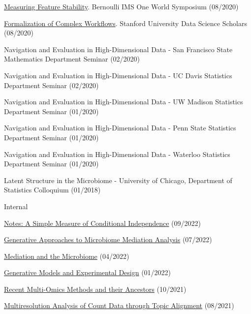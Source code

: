 \documentclass[letterpaper]{article}
\renewenvironment{itemize}{
  \begin{list}{}{
    \setlength{\leftmargin}{1.5em}
  }
}{
  \end{list}
}
\begin{document}
\begin{itemize}
  \item \href{https://www.youtube.com/watch?v=0W84gxCm83A}{Measuring Feature Stability}. Bernoulli IMS One World Symposium (08/2020)
  \item \href{https://drive.google.com/file/d/1mSRbA96aTuiIHSUmgfZKV788seF3X7p_/view?usp=sharing}{Formalization of Complex Workflows}. Stanford University Data Science Scholars (08/2020)
  \item Navigation and Evaluation in High-Dimensional Data - San Francisco State Mathematics Department Seminar (02/2020)
  \item Navigation and Evaluation in High-Dimensional Data - UC Davis Statistics Department Seminar (02/2020)
  \item Navigation and Evaluation in High-Dimensional Data - UW Madison Statistics Department Seminar (01/2020)
  \item Navigation and Evaluation in High-Dimensional Data - Penn State Statistics Department Seminar (01/2020)
  \item Navigation and Evaluation in High-Dimensional Data - Waterloo Statistics Department Seminar (01/2020)
  \item Latent Structure in the Microbiome - University of Chicago, Department of Statistics Colloquium (01/2018)
\end{itemize}

Internal
\begin{itemize}
  \item \href{https://krisrs1128.github.io/talks/2022/20220930/20220930.html}{Notes: A Simple Measure of Conditional Independence} (09/2022)
  \item \href{https://drive.google.com/file/d/1n6gEubzFuIRRRYxGewY81k1ZdQS24oKg/view}{Generative Approaches to Microbiome Mediation Analysis} (07/2022)
  \item \href{https://drive.google.com/file/d/17xNjMA-pH70wM_gknUnM0A5gr0k87gAo/view}{Mediation and the Microbiome} (04/2022)
  \item \href{https://drive.google.com/file/d/1OMIulBki_0an7Lwd0MKPGH1f0OdK0etH/view}{Generative Models and Experimental Design} (01/2022)
  \item \href{https://drive.google.com/file/d/1L2crRIcdbql__XZdJuiRXkAKsvwrIZLO/view}{Recent Multi-Omics Methods and their Ancestors} (10/2021)
  \item \href{https://drive.google.com/file/d/1VcXF0fAK2IlA3yXeqnJ_1CGC6BP4zPqp/view}{Multiresolution Analysis of Count Data through Topic Alignment} (08/2021)
\end{itemize}
\end{document}
